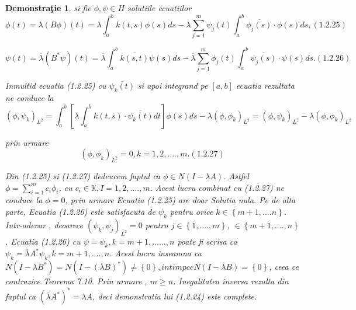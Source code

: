 \documentclass[a4paper,12pt,oneside]{report}
\newtheorem{demonstration}{Demonstra\c tie}
\begin{document}
\begin{demonstration}
		si fie \(\phi , \psi  \in H\) solutiile ecuatiilor
		\begin{displaymath}
			\phi \left ( t \right ) = \lambda \left ( B\phi  \right )\left ( t \right ) = \lambda \int_{a}^{b} k\left ( t,s \right )\phi \left ( s \right )ds - \lambda \sum_{j=1}^{m}\psi _{j}\left ( t \right )\int_{a}^{b}\overline{\phi _{j}\left ( s \right )}\cdot \phi \left ( s \right )ds, (1.2.25)
		\end{displaymath}
										
		\begin{displaymath}
			\psi  \left ( t \right ) = \overline{\lambda} \left ( B^{\ast }\psi  \right )\left ( t \right ) = \overline{\lambda }\int_{a}^{b}\overline{k\left ( s,t \right )}\psi \left ( s \right )ds - \overline{\lambda }\sum_{j=1}^{m}\phi _{j}\left ( t \right )\int_{a}^{b}\overline{\psi _{j}\left ( s \right )}\cdot \psi \left ( s \right )ds. (1.2.26)
		\end{displaymath}
										
		Inmultid ecuatia (1.2.25) cu \(\overline{\psi _{k}\left ( t \right )}\) si apoi integrand pe \(\left [ a,b \right ]\) ecuatia rezultata ne conduce la 
		\begin{displaymath}
			\left ( \phi ,\psi _{k} \right )_{L^{2}} = \int_{a}^{b}\left [ \lambda \int_{a}^{b}k\left ( t,s \right ) \cdot \overline{\psi _{k}\left ( t \right )}dt \right ]\phi \left ( s \right )ds - \lambda \left ( \phi ,\phi _{k} \right )_{L^{2}} = \left ( \phi ,\psi _{k} \right )_{L^{2}} - \lambda \left ( \phi ,\phi _{k} \right )_{L^{2}}
		\end{displaymath}
										
		prin urmare 
		\begin{displaymath}
			\left ( \phi ,\phi _{k} \right )_{L^{2}} = 0, k=1,2,....,m. (1.2.27)
		\end{displaymath}
										
		Din (1.2.25) si (1.2.27) dedeucem faptul ca \(\phi \in N\left ( I-\lambda A \right )\). Astfel \(\phi = \sum_{i=1}^{m}c_{i}\phi _{i}\), cu \(c_{i}\in\mathbb{K}, I = 1,2,….,m\). Acest lucru combinat cu (1.2.27) ne conduce la \(\phi = 0\), prin urmare Ecuatia (1.2.25) are doar Solutia nula. Pe de alta parte, Ecuatia (1.2.26) este satisfacuta de \(\psi _{k}\) pentru orice \(k\in \left \{ m+1,....n \right \}\). Intr-adevar , deoarece \(\left ( \psi _{k} , \psi _{j}\right )_{L^{2}} = 0\) pentru \(j \in \left \{ 1,....,m \right \}\),  \(\in \left \{ m+1,....,n \right \}\), Ecuatia (1.2.26) cu \(\psi =\psi _{k}, k = m+1,……,n\) poate fi scrisa ca \(\psi _{k} = \overline{\lambda }A^{\ast }\psi _{k}, k = m+1,....,n\). Acest lucru inseamna ca \(N\left ( I - \overline{\lambda }B^{\ast } \right ) = N\left ( I - \left (\lambda B   \right )^{\ast } \right )\neq \left \{ 0 \right \}, in timp ce N\left ( I - \lambda B \right ) = \left \{ 0 \right \}\), ceea ce contrazice Teorema 7.10. Prin urmare , \(m\geq n\). Inegalitatea inversa rezulta din faptul ca \(\left ( \overline{\lambda }A^{\ast } \right )^{\ast } = \lambda A\), deci demonstratia lui (1.2.24) este complete. 
	\end{demonstration}
					
\end{document}
